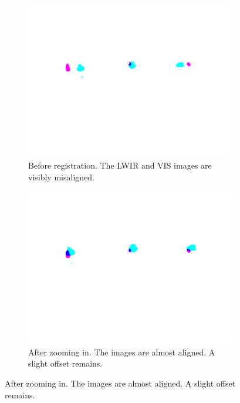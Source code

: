\documentclass{l4proj}
\begin{document}
\begin{figure}[ht]
  \centering
  \begin{subfigure}[h!]{0.3\textwidth}
    \includegraphics[width=\textwidth, trim={3.5cm 9cm 3.5cm 4.5cm}, clip, frame]{images/registration/unregistered.png}
    \caption{Before registration. The LWIR and VIS images are visibly misaligned.}
    \label{fig:linear_trans_before}
  \end{subfigure}
  \begin{subfigure}[h!]{0.3\textwidth}
    \includegraphics[width=\textwidth, trim={3.5cm 9cm 3.5cm 4.5cm}, clip, frame]{images/registration/registered_zoom.png}
    \caption{After zooming in. The images are almost aligned. A slight offset remains.}

\end{subfigure}
\end{figure}
\end{document}
